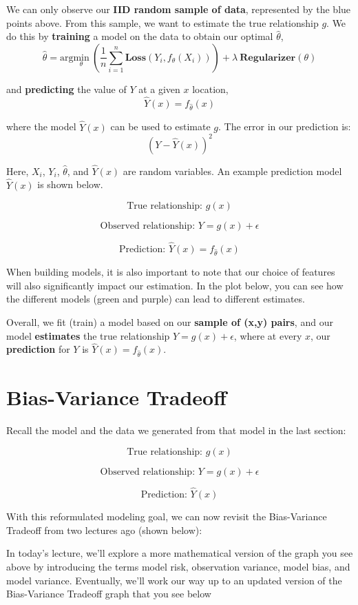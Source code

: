 \documentclass[
  letterpaper,
  DIV=11,
  numbers=noendperiod]{scrreprt}
\begin{document}
We can only observe our \textbf{IID random sample of data}, represented
by the blue points above. From this sample, we want to estimate the true
relationship \(g\). We do this by \textbf{training} a model on the data
to obtain our optimal \(\hat{\theta}\),
\[ {\hat{\theta}} = \text{arg}\underset{\theta}{\text{min}}\  \left(\frac{1}{n} \sum_{i=1}^n \textbf{Loss}(Y_i, f_{\theta}(X_i))\right) + \lambda\ \textbf{Regularizer}(\theta)\]

and \textbf{predicting} the value of \(Y\) at a given \(x\) location,
\[ \hat{Y}(x) = f_{\hat{\theta}}(x)\]

where the model \(\hat{Y}(x)\) can be used to estimate \(g\). The error
in our prediction is: \[ (Y-\hat{Y}(x))^2\]

Here, \(X_i\), \(Y_i\), \(\hat{\theta}\), and \(\hat{Y}(x)\) are random
variables. An example prediction model \(\hat{Y}(x)\) is shown below.

\[\text{True relationship: } g(x)\]

\[\text{Observed relationship: }Y = g(x) + \epsilon\]

\[\text{Prediction: }\hat{Y}(x) = f_{\hat{\theta}}(x)\]

When building models, it is also important to note that our choice of
features will also significantly impact our estimation. In the plot
below, you can see how the different models (green and purple) can lead
to different estimates.

Overall, we fit (train) a model based on our \textbf{sample of (x,y)
pairs}, and our model \textbf{estimates} the true relationship
\(Y=g(x)+\epsilon\), where at every \(x\), our \textbf{prediction} for
\(Y\) is \(\hat{Y}(x) = f_{\hat{\theta}}(x)\).

\section{Bias-Variance Tradeoff}\label{sec-bias-variance-tradeoff}

Recall the model and the data we generated from that model in the last
section:

\[\text{True relationship: } g(x)\]

\[\text{Observed relationship: }Y = g(x) + \epsilon\]

\[\text{Prediction: }\hat{Y}(x)\]

With this reformulated modeling goal, we can now revisit the
Bias-Variance Tradeoff from two lectures ago (shown below):

In today's lecture, we'll explore a more mathematical version of the
graph you see above by introducing the terms model risk, observation
variance, model bias, and model variance. Eventually, we'll work our way
up to an updated version of the Bias-Variance Tradeoff graph that you
see below
\end{document}
